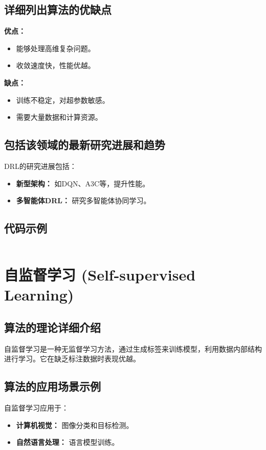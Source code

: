 \subsection*{详细列出算法的优缺点}
\textbf{优点：}
\begin{itemize}
    \item 能够处理高维复杂问题。
    \item 收敛速度快，性能优越。
\end{itemize}

\textbf{缺点：}
\begin{itemize}
    \item 训练不稳定，对超参数敏感。
    \item 需要大量数据和计算资源。
\end{itemize}

\subsection*{包括该领域的最新研究进展和趋势}
DRL的研究进展包括：
\begin{itemize}
    \item \textbf{新型架构：} 如DQN、A3C等，提升性能。
    \item \textbf{多智能体DRL：} 研究多智能体协同学习。
\end{itemize}
\subsection*{代码示例}
\begin{lstlisting}

\end{lstlisting}


\section{自监督学习 (Self-supervised Learning)}
\subsection*{算法的理论详细介绍}
自监督学习是一种无监督学习方法，通过生成标签来训练模型，利用数据内部结构进行学习。它在缺乏标注数据时表现优越。

\subsection*{算法的应用场景示例}
自监督学习应用于：
\begin{itemize}
    \item \textbf{计算机视觉：} 图像分类和目标检测。
    \item \textbf{自然语言处理：} 语言模型训练。
\end{itemize}

